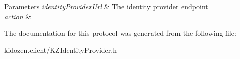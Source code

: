 \begin{DoxyParams}{Parameters}
{\em identity\-Provider\-Url} & The identity provider endpoint \\
\hline
{\em action} & \\
\hline
\end{DoxyParams}


The documentation for this protocol was generated from the following file\-:\begin{DoxyCompactItemize}
\item 
kidozen.\-client/K\-Z\-Identity\-Provider.\-h\end{DoxyCompactItemize}

